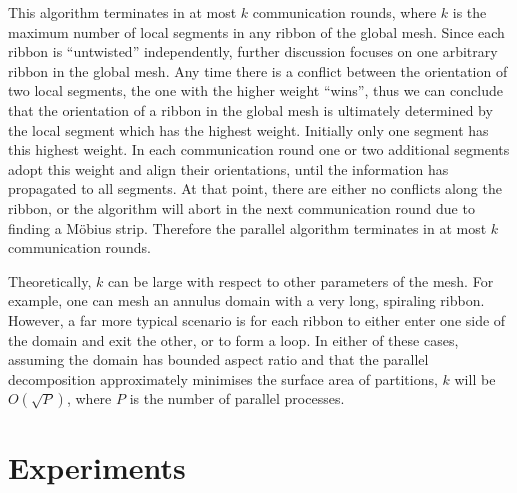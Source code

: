 \documentclass[oneeqnum,onethmnum,onefignum,onetabnum]{siamltex1213}
\begin{document}
This algorithm terminates in at most $ k $ communication rounds, where
$ k $ is the maximum number of local segments in any ribbon of the
global mesh. Since each ribbon is ``untwisted'' independently, further
discussion focuses on one arbitrary ribbon in the global mesh.
Any time there is a conflict between the orientation of two local
segments, the one with the higher weight ``wins'', thus we can
conclude that the orientation of a ribbon in the global mesh is
ultimately determined by the local segment which has the highest
weight. Initially only one segment has this highest weight. In each
communication round one or two additional segments adopt this weight
and align their orientations, until the information has propagated
to all segments. At that point, there are either no conflicts along
the ribbon, or the algorithm will abort in the next communication
round due to finding a Möbius strip. Therefore the parallel
algorithm terminates in at most $ k $ communication rounds.

Theoretically, $ k $ can be large with respect to other parameters of the
mesh. For example, one can mesh an annulus domain with a very long,
spiraling ribbon. However, a far more typical scenario is for each ribbon to
either enter one side of the domain and exit the other, or to form a
loop. In either of these cases, assuming the domain has bounded aspect ratio
and that the parallel decomposition approximately minimises the surface area
of partitions, $ k $ will be $ O(\sqrt{P}) $, where $ P $ is the number of
parallel processes.

\section{Experiments}
\label{sec:experiments}
\end{document}
